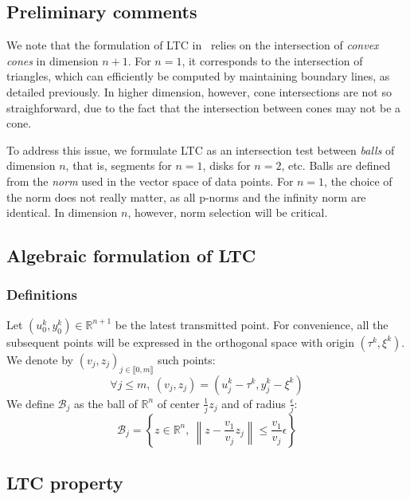 \documentclass[10pt, conference, compsocconf]{IEEEtran}
\newcommand{\norm}[1]{\left\lVert#1\right\rVert}
\begin{document}
\subsection{Preliminary comments}

We note that the formulation of LTC in~\cite{schoellhammer2004lightweight} relies on 
the intersection of \emph{convex cones} in dimension $n+1$. For $n=1$, it 
corresponds to the intersection of triangles, which can efficiently be 
computed by maintaining boundary lines, as detailed previously. In higher dimension, however, cone intersections are not so 
straighforward, due to the fact that the intersection between cones 
may not be a cone.

To address this issue, we formulate LTC as an intersection test between 
\emph{balls} of dimension $n$, that is, segments for $n=1$, disks for 
$n=2$, etc. Balls are defined from the \emph{norm} used in 
the vector space of data points. For $n=1$, the choice of the norm does 
not really matter, as all p-norms and the infinity norm are identical. 
In dimension $n$, however, norm selection will be critical.

\subsection{Algebraic formulation of LTC}

\subsubsection{Definitions}

Let $(u_0^k, y_0^k) \in \mathbb{R}^{n+1}$ be the latest transmitted point. For convenience, all the subsequent points will be 
expressed in the orthogonal space with origin $(\tau^k, \xi^k)$. We denote by $(v_j, z_j)_{j \in \llbracket 0, m \rrbracket}$ such points:
\begin{equation*}
\forall j \leq m,\  (v_j, z_j) = (u_j^k - \tau^k, y_j^k - \xi^k)
\end{equation*}
We define $\mathcal{B}_j$ as the ball of $\mathbb{R}^n$ of center $\frac{1}{j}z_j$ and of radius 
$\frac{\epsilon}{j}$:
\begin{equation*}
\mathcal{B}_j = \left\{ z \in \mathbb{R}^n,\  \norm{z-\frac{v_1}{v_j}z_j} \leq \frac{v_1}{v_j}\epsilon \right\}
\end{equation*}

\subsection{LTC property}
\end{document}
